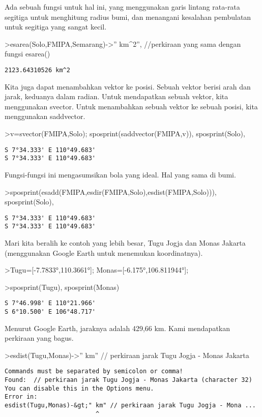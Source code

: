 \documentclass[
]{book}
\begin{document}
Ada sebuah fungsi untuk hal ini, yang menggunakan garis lintang rata-rata segitiga untuk menghitung radius bumi, dan menangani kesalahan pembulatan untuk segitiga yang sangat kecil.

\textgreater esarea(Solo,FMIPA,Semarang)-\textgreater'' km\^{}2'', //perkiraan yang sama dengan fungsi esarea()

\begin{verbatim}
2123.64310526 km^2
\end{verbatim}

Kita juga dapat menambahkan vektor ke posisi. Sebuah vektor berisi arah dan jarak, keduanya dalam radian. Untuk mendapatkan sebuah vektor, kita menggunakan svector. Untuk menambahkan sebuah vektor ke sebuah posisi, kita menggunakan saddvector.

\textgreater v=svector(FMIPA,Solo); sposprint(saddvector(FMIPA,v)), sposprint(Solo),

\begin{verbatim}
S 7°34.333' E 110°49.683'
S 7°34.333' E 110°49.683'
\end{verbatim}

Fungsi-fungsi ini mengasumsikan bola yang ideal. Hal yang sama di bumi.

\textgreater sposprint(esadd(FMIPA,esdir(FMIPA,Solo),esdist(FMIPA,Solo))), sposprint(Solo),

\begin{verbatim}
S 7°34.333' E 110°49.683'
S 7°34.333' E 110°49.683'
\end{verbatim}

Mari kita beralih ke contoh yang lebih besar, Tugu Jogja dan Monas Jakarta (menggunakan Google Earth untuk menemukan koordinatnya).

\textgreater Tugu={[}-7.7833°,110.3661°{]}; Monas={[}-6.175°,106.811944°{]};

\textgreater sposprint(Tugu), sposprint(Monas)

\begin{verbatim}
S 7°46.998' E 110°21.966'
S 6°10.500' E 106°48.717'
\end{verbatim}

Menurut Google Earth, jaraknya adalah 429,66 km. Kami mendapatkan perkiraan yang bagus.

\textgreater esdist(Tugu,Monas)-\textgreater'' km'' // perkiraan jarak Tugu Jogja - Monas Jakarta

\begin{verbatim}
Commands must be separated by semicolon or comma!
Found:  // perkiraan jarak Tugu Jogja - Monas Jakarta (character 32)
You can disable this in the Options menu.
Error in:
esdist(Tugu,Monas)-&gt;" km" // perkiraan jarak Tugu Jogja - Mona ...
                         ^
\end{verbatim}
\end{document}
